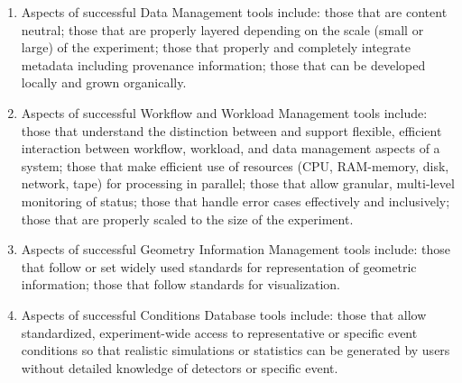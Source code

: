 \begin{enumerate}
\item Aspects of successful Data Management tools include:
those that are content neutral; those that are properly layered depending on the scale (small or large) of the experiment; those that properly and 
completely integrate metadata including provenance information;  those that
can be developed locally and grown organically.

\item Aspects of successful Workflow and Workload Management tools include:
those that understand the distinction between and support flexible, efficient 
interaction between workflow, workload, and data management aspects 
of a system; those that make efficient use of resources (CPU, RAM-memory, 
disk, network, tape) for processing in parallel;  those that allow 
granular, multi-level monitoring of status; those that handle error 
cases effectively and inclusively; those that are properly scaled 
to the size of the experiment.

\item Aspects of successful Geometry Information Management tools include:
those that follow or set widely used standards for representation of
geometric information; those that follow standards for visualization.

\item Aspects of successful Conditions Database tools include:
those that allow standardized, experiment-wide access to representative 
or specific event conditions so that realistic simulations or statistics
can be generated by users without detailed knowledge of detectors or specific
event.

\end{enumerate}

